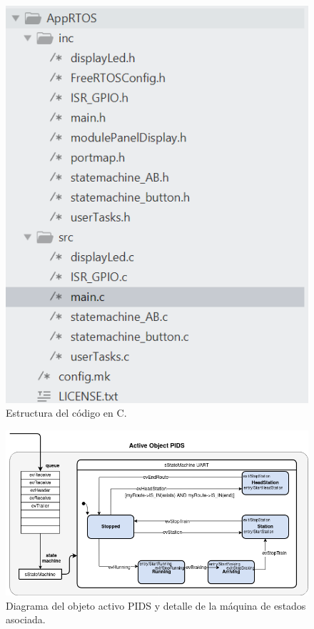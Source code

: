 \begin{figure}[ht]
	\centering
	\includegraphics[width=1\textwidth]{./Figures/estructuraCodigos.png}
	\caption{Estructura del código en C.}
	\label{fig:codestructure}
\end{figure}

\begin{figure}[ht]
	\centering
	\includegraphics[width=1\textwidth]{./Figures/fsmTrain.png}
	\caption{Diagrama del objeto activo PIDS y detalle de la máquina de estados asociada.}
	\label{fig:fsmTrain}
\end{figure}

